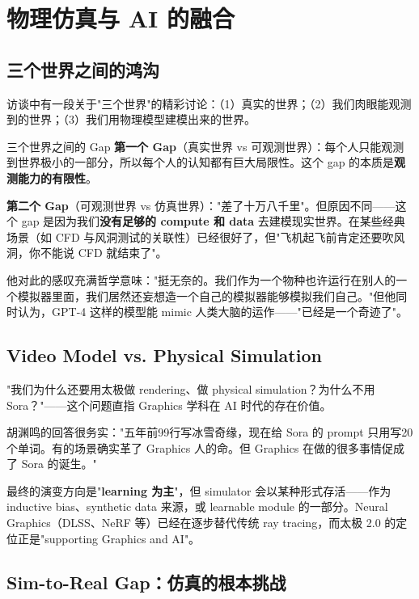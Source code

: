 \section{物理仿真与 AI 的融合}

\subsection{三个世界之间的鸿沟}

访谈中有一段关于"三个世界"的精彩讨论：（1）真实的世界；（2）我们肉眼能观测到的世界；（3）我们用物理模型建模出来的世界。

\begin{importantbox}{三个世界之间的 Gap}
\textbf{第一个 Gap}（真实世界 vs 可观测世界）：每个人只能观测到世界极小的一部分，所以每个人的认知都有巨大局限性。这个 gap 的本质是\textbf{观测能力的有限性}。

\textbf{第二个 Gap}（可观测世界 vs 仿真世界）："差了十万八千里"。但原因不同——这个 gap 是因为我们\textbf{没有足够的 compute 和 data} 去建模现实世界。在某些经典场景（如 CFD 与风洞测试的关联性）已经很好了，但"飞机起飞前肯定还要吹风洞，你不能说 CFD 就结束了"。
\end{importantbox}

他对此的感叹充满哲学意味："挺无奈的。我们作为一个物种也许运行在别人的一个模拟器里面，我们居然还妄想造一个自己的模拟器能够模拟我们自己。"但他同时认为，GPT-4 这样的模型能 mimic 人类大脑的运作——"已经是一个奇迹了"。

\subsection{Video Model vs. Physical Simulation}

"我们为什么还要用太极做 rendering、做 physical simulation？为什么不用 Sora？"——这个问题直指 Graphics 学科在 AI 时代的存在价值。

胡渊鸣的回答很务实："五年前99行写冰雪奇缘，现在给 Sora 的 prompt 只用写20个单词。有的场景确实革了 Graphics 人的命。但 Graphics 在做的很多事情促成了 Sora 的诞生。"

最终的演变方向是"\textbf{learning 为主}"，但 simulator 会以某种形式存活——作为 inductive bias、synthetic data 来源，或 learnable module 的一部分。Neural Graphics（DLSS、NeRF 等）已经在逐步替代传统 ray tracing，而太极 2.0 的定位正是"supporting Graphics and AI"。

\subsection{Sim-to-Real Gap：仿真的根本挑战}

